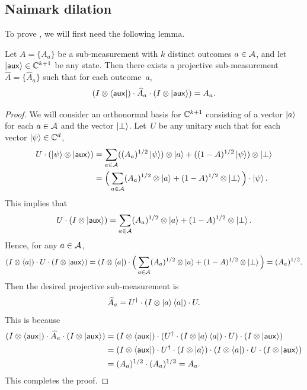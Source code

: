 \subsection{Naimark dilation}\label{sec:naimark}

To prove , we will first need the following lemma.

\begin{lemma}
  \label{lem:naimark-helper}
  Let $A = \{A_{a}\}$ be a sub-measurement with $k$ distinct outcomes $a \in \mathcal{A}$, and let $\ket{\mathsf{aux}} \in \mathbb C^{k+1}$ be any state. Then there exists a projective sub-measurement $\widehat{A} = \{\widehat{A}_{a}\}$ such that
  for each outcome~$a$,
  \[ (I \otimes \bra{\mathsf{aux}} ) \cdot \widehat{A}_{a} \cdot (I \otimes \ket{\mathsf{aux}}) =
    A_{a}. \]
\end{lemma}
\begin{proof}
We will consider an orthonormal basis for $\mathbb C^{k+1}$
consisting of a vector $\ket{a}$ for each $a \in \mathcal{A}$ and the vector $\ket{\bot}$.
Let~$U$ be any unitary such that for each vector $\ket{\psi} \in \mathbb C^d$,
\begin{align*}
U \cdot (\ket{\psi} \otimes \ket{\mathsf{aux}})
&= \sum_{a \in \mathcal{A}} ((A_{a})^{1/2} \ket{\psi}) \otimes \ket{a} + ((1 - A)^{1/2}\ket{\psi}) \otimes \ket{\bot}\\
&= \Big(\sum_{a \in \mathcal{A}} (A_{a})^{1/2} \otimes \ket{a} + (1 - A)^{1/2} \otimes \ket{\bot}\Big)
		\cdot \ket{\psi}.
\end{align*}
This implies that
\begin{equation*}
U \cdot (I \otimes \ket{\mathsf{aux}})
= \sum_{a \in \mathcal{A}} (A_{a})^{1/2} \otimes \ket{a} + (1 - A)^{1/2} \otimes \ket{\bot}.
\end{equation*}
Hence, for any $a \in \mathcal{A}$,
\begin{equation*}
(I \otimes \bra{a}) \cdot U \cdot (I \otimes \ket{\mathsf{aux}})
= (I \otimes \bra{a}) \cdot \Big(\sum_{a \in \mathcal{A}} (A_{a})^{1/2} \otimes \ket{a} + (1 - A)^{1/2} \otimes \ket{\bot}\Big)
= (A_a)^{1/2}.
\end{equation*}
  Then the desired projective sub-measurement is
  \[ \widehat{A}_a = U^{\dagger} \cdot (I \otimes \ket{a} \bra{a}) \cdot U. \]
  This is because
\begin{align*}
 (I \otimes \bra{\mathsf{aux}} ) \cdot \widehat{A}_{a} \cdot (I \otimes \ket{\mathsf{aux}})
&=(I \otimes \bra{\mathsf{aux}} ) \cdot (U^{\dagger} \cdot (I \otimes \ket{a} \bra{a}) \cdot U) \cdot (I \otimes \ket{\mathsf{aux}})\\
&=(I \otimes \bra{\mathsf{aux}} ) \cdot U^{\dagger} \cdot (I \otimes \ket{a}) \cdot (I\otimes \bra{a}) \cdot U \cdot (I \otimes \ket{\mathsf{aux}})\\
&= (A_a)^{1/2} \cdot (A_a)^{1/2} = A_a.
\end{align*}
This completes the proof.
\end{proof}

